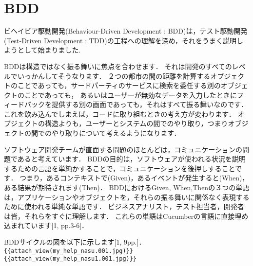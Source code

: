 \section{BDD}
ビヘイビア駆動開発(Behaviour-Driven Development : BDD)は，テスト駆動開発(Test-Driven Development : TDD)の工程への理解を深め，それをうまく説明しようとして始まりました.

BDDは構造ではなく振る舞いに焦点を合わせます．
それは開発のすべてのレベルでいっかんしてそうなります．
２つの都市の間の距離を計算するオブジェクトのことであっても，サードパーティのサービスに検索を委任する別のオブジェクトのことであっても，
あるいはユーザーが無効なデータを入力したときにフィードバックを提供する別の画面であっても，それはすべて振る舞いなのです．
これを飲み込んでしまえば，コードに取り組むときの考え方が変わります．
オブジェクトの構造よりも，ユーザーとシステムの間でのやり取り，つまりオブジェクトの間でのやり取りについて考えるようになります．

ソフトウェア開発チームが直面する問題のほとんどは，コミュニケーションの問題であると考えています．
BDDの目的は，ソフトウェアが使われる状況を説明するための言語を単純かすることで，コミュニケーションを後押しすることです．
つまり，あるコンテキストで(Given)，あるイベントが発生すると(When)，ある結果が期待されます(Then)．
BDDにおけるGiven, When,Thenの３つの単語は，アプリケーションやオブジェクトを，それらの振る舞いに関係なく表現するために使われる単純な単語です．
ビジネスアナリスト，テスト担当者，開発者は皆，それらをすぐに理解します．
これらの単語はCucumberの言語に直接埋め込まれています[1, pp.3-6]．

BDDサイクルの図を以下に示します[1, 9pp.]．
\verb|{{attach_view(my_help_nasu.001.jpg)}}|
\verb|{{attach_view(my_help_nasu1.001.jpg)}}|

